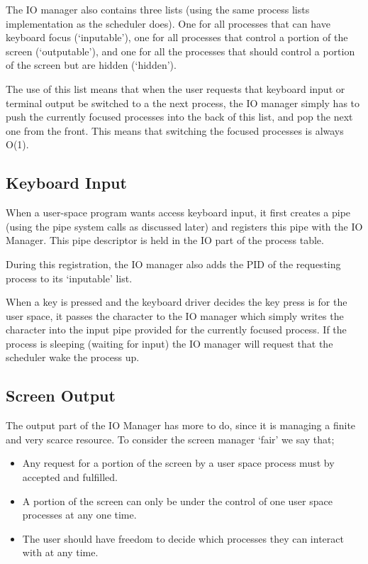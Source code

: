 \documentclass[a4paper]{report}
\begin{document}
The IO manager also contains three lists (using the same process lists implementation as the scheduler does). One for all processes that can have keyboard focus (`inputable'), one for all processes that control a portion of the screen (`outputable'), and one for all the processes that should control a portion of the screen but are hidden (`hidden').

The use of this list means that when the user requests that keyboard input or terminal output be switched to a the next process, the IO manager simply has to push the currently focused processes into the back of this list, and pop the next one from the front. This means that switching the focused processes is always O(1).

\subsection{Keyboard Input}

When a user-space program wants access keyboard input, it first creates a pipe (using the pipe system calls as discussed later) and registers this pipe with the IO Manager. This pipe descriptor is held in the IO part of the process table.

During this registration, the IO manager also adds the PID of the requesting process to its `inputable' list.

When a key is pressed and the keyboard driver decides the key press is for the user space, it passes the character to the IO manager which simply writes the character into the input pipe provided for the currently focused process. If the process is sleeping (waiting for input) the IO manager will request that the scheduler wake the process up.

\subsection{Screen Output}

The output part of the IO Manager has more to do, since it is managing a finite and very scarce resource. To consider the screen manager `fair' we say that;
\begin{itemize}
\item Any request for a portion of the screen by a user space process must by accepted and fulfilled.
\item A portion of the screen can only be under the control of one user space processes at any one time.
\item The user should have freedom to decide which processes they can interact with at any time.
\end{itemize}
\end{document}
